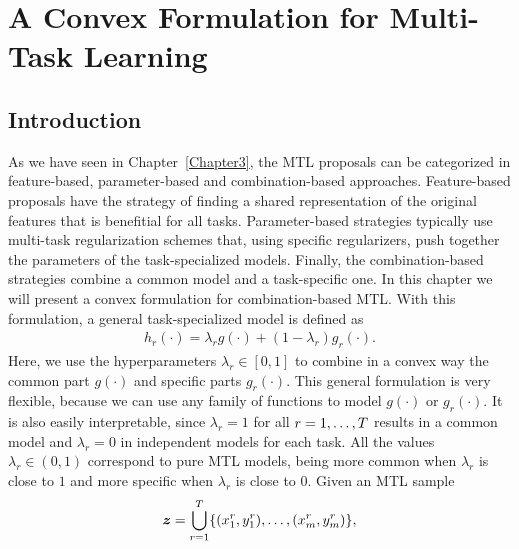 
\chapter{A Convex Formulation for Multi-Task Learning} %
\label{Chapter4}

{\bf \small{

}}

\section{Introduction}
As we have seen in Chapter~\ref{Chapter3}, the MTL proposals can be categorized in feature-based, parameter-based and combination-based approaches. Feature-based proposals have the strategy of finding a shared representation of the original features that is benefitial for all tasks. Parameter-based strategies typically use multi-task regularization schemes that, using specific regularizers, push together the parameters of the task-specialized models.
Finally, the combination-based strategies combine a common model and a task-specific one. 
%
In this chapter we will present a convex formulation for combination-based MTL. With this formulation, a general task-specialized model is defined as
\begin{equation}
    \label{eq:convexmtl_general}
    \begin{aligned}
        h_r(\cdot)
       = \lambda_r g(\cdot) + (1 - \lambda_r) g_r(\cdot) .
    \end{aligned}    
\end{equation}
Here, we use the hyperparameters $\lambda_r \in [0, 1]$ to combine in a convex way the common part $g(\cdot)$ and specific parts $g_r(\cdot)$. This general formulation is very flexible, because we can use any family of functions to model $g(\cdot)$ or $g_r(\cdot)$. It is also easily interpretable, since $\lambda_r=1$ for all $r=1, \ldots, T$ results in a common model and $\lambda_r=0$ in independent models for each task. All the values $\lambda_r \in (0, 1)$ correspond to pure MTL models, being more common when $\lambda_r$ is close to $1$ and more specific when $\lambda_r$ is close to $0$.
%
Given an MTL sample 
$$\bm{z} = \bigcup_{r=1}^T \{(x_1^r, y_1^r), \ldots, (x_{m}^r, y_{m}^r)\},$$
